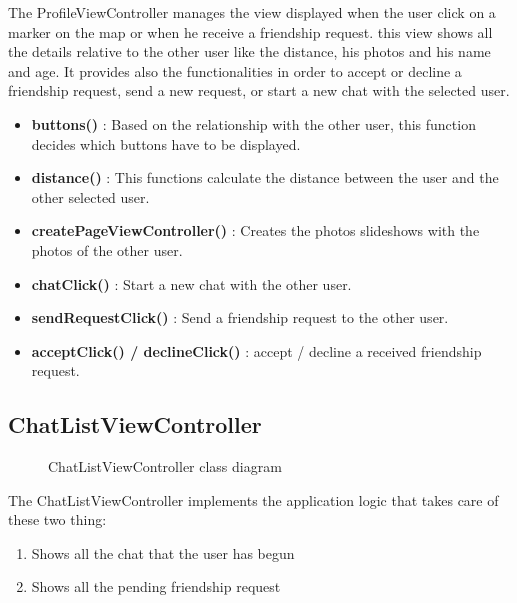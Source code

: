 The ProfileViewController manages the view displayed when the user click on a marker on the map or when he receive a friendship request. this view shows all the details relative to the other user like the distance, his photos and his name and age. It provides also the functionalities in order to accept or decline a friendship request, send a new request, or start a new chat with the selected user.

\begin{itemize}
\item \textbf{buttons()} : Based on the relationship with the other user, this function decides which buttons have to be displayed.
\item \textbf{distance()} : This functions calculate the distance between the user and the other selected user.
\item \textbf{createPageViewController()} : Creates the photos slideshows with the photos of the other user.
\item \textbf{chatClick()} : Start a new chat with the other user.
\item \textbf{sendRequestClick()} : Send a friendship request to the other user.
\item \textbf{acceptClick() / declineClick()} : accept / decline a received friendship request.
\end{itemize}

\newpage
\subsection{ChatListViewController} 


\begin{figure}[H]
\caption{ChatListViewController class diagram}
\end{figure}

The ChatListViewController implements the application logic that takes care of these two thing:

\begin{enumerate}
\item Shows all the chat that the user has begun
\item Shows all the pending friendship request
\end{enumerate}

